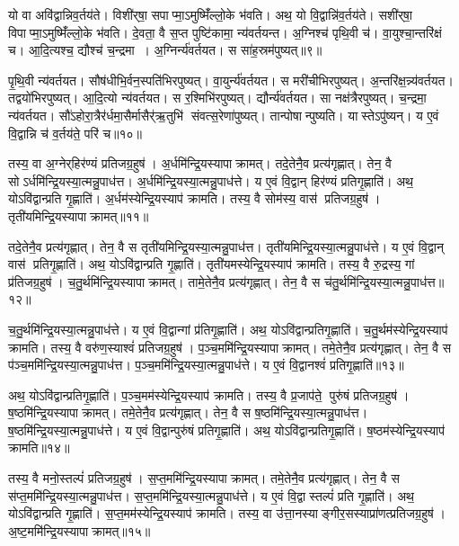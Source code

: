 यो वा अवि॑द्वान्निव॒र्तय॑ते।
विशी॑र्‌षा॒ सपाप्मा॒ऽमुष्मिँ॑ल्लो॒के भ॑वति।
अथ॒ यो वि॒द्वान्नि॑व॒र्तय॑ते।
सशी॑र्‌षा॒ विपाप्मा॒ऽमुष्मिँ॑ल्लो॒के भ॑वति।
दे॒वता॒ वै स॒प्त पुष्टि॑कामा॒ न्य॑वर्तयन्त।
अ॒ग्निश्च॑ पृथि॒वी च॑।
वा॒युश्चा॒न्तरि॑क्षं च।
आ॒दि॒त्यश्च॒ द्यौश्च॑ च॒न्द्रमा।
अ॒ग्निर्न्य॑वर्तयत।
स सा॑ह॒स्रम॑पुष्यत्॥९॥

पृ॒थि॒वी न्य॑वर्तयत।
सौष॑धीभि॒र्वन॒स्पति॑भिरपुष्यत्।
वा॒युर्न्य॑वर्तयत।
स मरी॑चीभिरपुष्यत्।
अ॒न्तरि॑क्ष॒न्न्य॑वर्तयत।
तद्वयो॑भिरपुष्यत्।
आ॒दि॒त्यो न्य॑वर्तयत।
स र॒श्मिभि॑रपुष्यत्।
द्यौर्न्य॑वर्तयत।
सा नक्ष॑त्रैरपुष्यत्।
च॒न्द्रमा॒ न्य॑वर्तयत।
सौ॑ऽहोरा॒त्रैर॑र्धमा॒सैर्मासैर्॑ऋ॒तुभि॑ संवत्स॒रेणा॑पुष्यत्।
तान्पोषान्पुष्यति।
यास्तेऽपु॑ष्यन्।
य ए॒वं वि॒द्वान्नि च॑ व॒र्तय॑ते॒ परि॑ च॥१०॥\anuvakamend[अ॒पु॒ष्य॒न्नक्ष॑त्रैरपुष्य॒त्पञ्च॑ च]

तस्य॒ वा अ॒ग्नेर्‌हिर॑ण्यं प्रतिजग्र॒हुष॑।
अ॒र्धमि॑न्द्रि॒यस्यापाक्रामत्।
तदे॒तेनै॒व प्रत्य॑गृह्णात्।
तेन॒ वै सोऽर्धमि॑न्द्रि॒यस्या॒त्मन्नु॒पाध॑त्त।
अ॒र्धमि॑न्द्रि॒यस्या॒त्मन्नु॒पाध॑त्ते।
य ए॒वं वि॒द्वान् हिर॑ण्यं प्रतिगृ॒ह्णाति॑।
अथ॒ योऽवि॑द्वान्प्रति गृ॒ह्णाति॑।
अ॒र्धम॑स्येन्द्रि॒यस्याप॑ क्रामति।
तस्य॒ वै सोम॑स्य॒ वास॑ प्रतिजग्र॒हुष॑।
तृती॑यमिन्द्रि॒यस्यापाक्रामत्॥११॥

तदे॒तेनै॒व प्रत्य॑गृह्णात्।
तेन॒ वै स तृती॑यमिन्द्रि॒यस्या॒त्मन्नु॒पाध॑त्त।
तृती॑यमिन्द्रि॒यस्या॒त्मन्नु॒पाध॑त्ते।
य ए॒वं वि॒द्वान् वास॑ प्रतिगृ॒ह्णाति॑।
अथ॒ योऽवि॑द्वान्प्रति गृ॒ह्णाति॑।
तृती॑यमस्येन्द्रि॒यस्याप॑ क्रामति।
तस्य॒ वै रु॒द्रस्य॒ गां प्र॑तिजग्र॒हुष॑।
च॒तु॒र्थमि॑न्द्रि॒यस्यापाक्रामत्।
तामे॒तेनै॒व प्रत्य॑गृह्णात्।
तेन॒ वै स च॑तु॒र्थमि॑न्द्रि॒यस्या॒त्मन्नु॒पाध॑त्त॥१२॥

च॒तु॒र्थमि॑न्द्रि॒यस्या॒त्मन्नु॒पाध॑त्ते।
य ए॒वं वि॒द्वान्गां प्र॑तिगृ॒ह्णाति॑।
अथ॒ योऽवि॑द्वान्प्रतिगृ॒ह्णाति॑।
च॒तु॒र्थम॑स्येन्द्रि॒यस्याप॑ क्रामति।
तस्य॒ वै वरु॑ण॒स्याश्वं॑ प्रतिजग्र॒हुष॑।
प॒ञ्च॒ममि॑न्द्रि॒यस्यापाक्रामत्।
तमे॒तेनै॒व प्रत्य॑गृह्णात्।
तेन॒ वै स प॑ञ्च॒ममि॑न्द्रि॒यस्या॒त्मन्नु॒पाध॑त्त।
प॒ञ्च॒ममि॑न्द्रि॒यस्या॒त्मन्नु॒पाध॑त्ते।
य ए॒वं वि॒द्वानश्वं॑ प्रतिगृ॒ह्णाति॑॥१३॥

अथ॒ योऽवि॑द्वान्प्रतिगृ॒ह्णाति॑।
प॒ञ्च॒मम॑स्येन्द्रि॒यस्याप॑ क्रामति।
तस्य॒ वै प्र॒जाप॑ते॒ पुरु॑षं प्रतिजग्र॒हुष॑।
ष॒ष्ठमि॑न्द्रि॒यस्यापाक्रामत्।
तमे॒तेनै॒व प्रत्य॑गृह्णात्।
तेन॒ वै स ष॒ष्ठमि॑न्द्रि॒यस्या॒त्मन्नु॒पाध॑त्त।
ष॒ष्ठमि॑न्द्रि॒यस्या॒त्मन्नु॒पाध॑त्ते।
य ए॒वं वि॒द्वान्पुरु॑षं प्रतिगृ॒ह्णाति॑।
अथ॒ योऽवि॑द्वान्प्रतिगृ॒ह्णाति॑।
ष॒ष्ठम॑स्येन्द्रि॒यस्याप॑ क्रामति॥१४॥

तस्य॒ वै मनो॒स्तल्पं॑ प्रतिजग्र॒हुष॑।
स॒प्त॒ममि॑न्द्रि॒यस्यापाक्रामत्।
तमे॒तेनै॒व प्रत्य॑गृह्णात्।
तेन॒ वै स स॑प्त॒ममि॑न्द्रि॒यस्या॒त्मन्नु॒पाध॑त्त।
स॒प्त॒ममि॑न्द्रि॒यस्या॒त्मन्नु॒पाध॑त्ते।
य ए॒वं वि॒द्वास्तल्पं॑ प्रति गृ॒ह्णाति॑।
अथ॒ योऽवि॑द्वान्प्रति गृ॒ह्णाति॑।
स॒प्त॒मम॑स्येन्द्रि॒यस्याप॑ क्रामति।
तस्य॒ वा उ॑त्ता॒नस्याङ्गीर॒सस्याप्रा॑णत्प्रतिजग्र॒हुष॑।
अ॒ष्ट॒ममि॑न्द्रि॒यस्यापाक्रामत्॥१५॥

